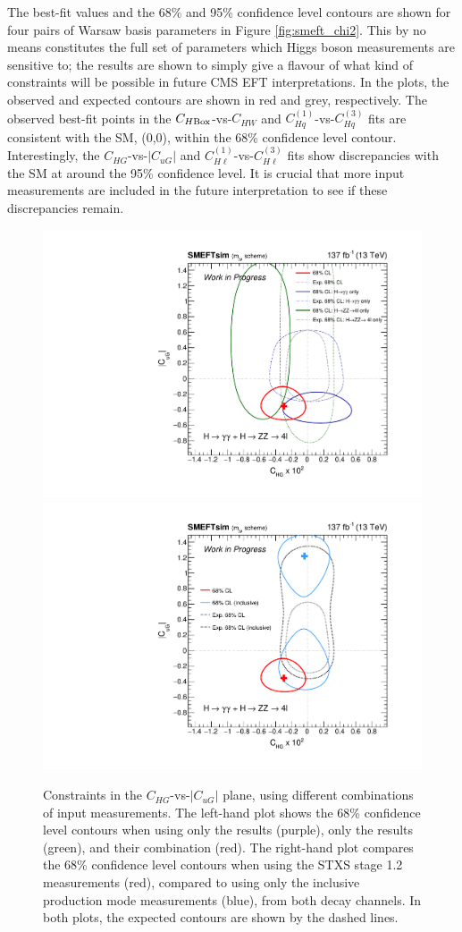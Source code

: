 The best-fit values and the 68\% and 95\% confidence level contours are shown for four pairs of Warsaw basis parameters in Figure \ref{fig:smeft_chi2}. This by no means constitutes the full set of parameters which Higgs boson measurements are sensitive to; the results are shown to simply give a flavour of what kind of constraints will be possible in future CMS EFT interpretations. In the plots, the observed and expected contours are shown in red and grey, respectively. The observed best-fit points in the $C_{H{\rm{Box}}}$-vs-$C_{HW}$ and $C^{(1)}_{Hq}$-vs-$C^{(3)}_{Hq}$ fits are consistent with the SM, (0,0), within the 68\% confidence level contour. Interestingly, the $C_{HG}$-vs-$|C_{uG}|$ and $C^{(1)}_{H\ell}$-vs-$C^{(3)}_{H\ell}$ fits show discrepancies with the SM at around the 95\% confidence level. It is crucial that more input measurements are included in the future interpretation to see if these discrepancies remain.

\begin{figure}[htb!]
  \centering
  \includegraphics[width=.49\textwidth]{Figures/eft/smeft/chi2_chg_vs_cugabs_channelComp.pdf}
  \includegraphics[width=.49\textwidth]{Figures/eft/smeft/chi2_chg_vs_cugabs_stageComp.pdf}
  \caption[Constraints on Warsaw basis parameters using different input measurements]
  {
    Constraints in the $C_{HG}$-vs-$|C_{uG}|$ plane, using different combinations of input measurements. The left-hand plot shows the 68\% confidence level contours when using only the \Hgg results (purple), only the \Hfl results (green), and their combination (red). The right-hand plot compares the 68\% confidence level contours when using the STXS stage 1.2 measurements (red), compared to using only the inclusive production mode measurements (blue), from both decay channels. In both plots, the expected contours are shown by the dashed lines.
  }
  \label{fig:smeft_chi2_comp}
\end{figure}


